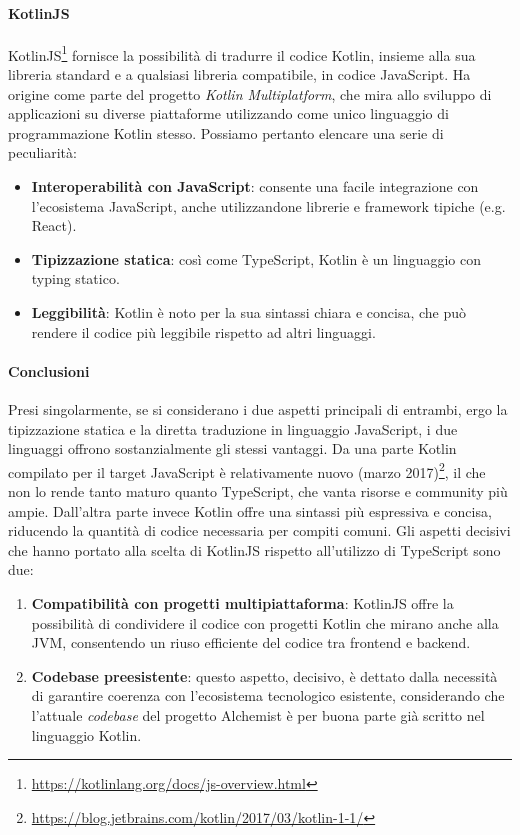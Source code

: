 \paragraph{KotlinJS}
KotlinJS\footnote{\url{https://kotlinlang.org/docs/js-overview.html}} fornisce la possibilità di tradurre il codice Kotlin, insieme alla sua libreria standard e a qualsiasi libreria compatibile, in codice JavaScript. Ha origine come parte del progetto \textit{Kotlin Multiplatform}, che mira allo sviluppo di applicazioni su diverse piattaforme utilizzando come unico linguaggio di programmazione Kotlin stesso. Possiamo pertanto elencare una serie di peculiarità:
\begin{itemize}
	\item \textbf{Interoperabilità con JavaScript}:  consente una facile integrazione con l'ecosistema JavaScript, anche utilizzandone librerie e framework tipiche (e.g. React). 
	\item \textbf{Tipizzazione statica}: così come TypeScript, Kotlin è un linguaggio con typing statico.
	\item \textbf{Leggibilità}: Kotlin è noto per la sua sintassi chiara e concisa, che può rendere il codice più leggibile rispetto ad altri linguaggi.
\end{itemize}

\paragraph{Conclusioni}
Presi singolarmente, se si considerano i due aspetti principali di entrambi, ergo la tipizzazione statica e la diretta traduzione in linguaggio JavaScript, i due linguaggi offrono sostanzialmente gli stessi vantaggi. Da una parte Kotlin compilato per il target JavaScript è relativamente nuovo (marzo 2017)\footnote{\url{https://blog.jetbrains.com/kotlin/2017/03/kotlin-1-1/}}, il che non lo rende tanto maturo quanto TypeScript, che vanta risorse e community più ampie. Dall'altra parte invece Kotlin offre una sintassi più espressiva e concisa, riducendo la quantità di codice necessaria per compiti comuni. Gli aspetti decisivi che hanno portato alla scelta di KotlinJS rispetto all'utilizzo di TypeScript sono due:
\begin{enumerate}
	\item \textbf{Compatibilità con progetti multipiattaforma}: KotlinJS offre la possibilità di condividere il codice con progetti Kotlin che mirano anche alla JVM, consentendo un riuso efficiente del codice tra frontend e backend.
	\item \textbf{Codebase preesistente}: questo aspetto, decisivo,  è dettato dalla necessità di garantire coerenza con l'ecosistema tecnologico esistente, considerando che l'attuale \textit{codebase} del progetto Alchemist è per buona parte già scritto nel linguaggio Kotlin.
\end{enumerate}

